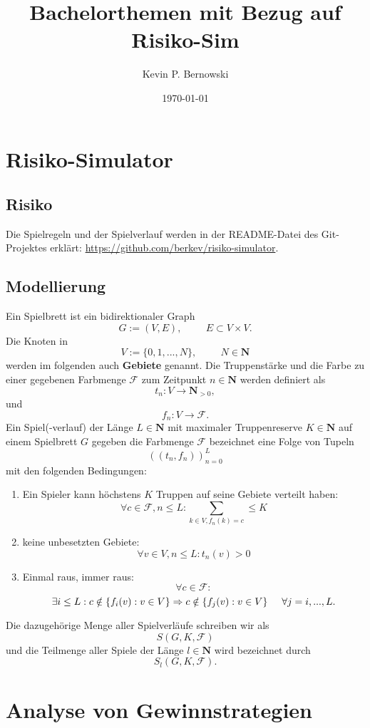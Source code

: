 \documentclass[12pt, letterpaper]{article}
\title{Bachelorthemen mit Bezug auf Risiko-Sim}
\author{Kevin P. Bernowski}
\date{\today}
\begin{document}
\maketitle
\tableofcontents
\section{Risiko-Simulator}
    \subsection{Risiko}

    Die Spielregeln und der Spielverlauf werden in der README-Datei des Git-Projektes erklärt: \url{https://github.com/berkev/risiko-simulator}.

    
    \subsection{Modellierung}

    Ein Spielbrett ist ein bidirektionaler Graph 
    \[G := (V,E), \hspace{1cm} E\subset V\times V.\]
    Die Knoten in 
    \[V :=\{0,1,...,N\}, \hspace{1cm} N \in \mathbf{N} \]
    werden im folgenden auch \textbf{Gebiete} genannt.
    \newline
    Die Truppenstärke und die Farbe zu einer gegebenen Farbmenge $\mathcal{F}$ zum Zeitpunkt $n\in\mathbf{N}$ werden definiert als
    \[ t_{n}:V\rightarrow \mathbf{N}_{>0},
    \] und 
    \[ f_{n}:V\rightarrow \mathcal{F}.\]
    \newline
    Ein Spiel(-verlauf) der Länge $L\in\mathbf{N}$ mit maximaler Truppenreserve $K\in\mathbf{N}$ auf einem Spielbrett $G$ gegeben die Farbmenge $\mathcal{F}$  bezeichnet eine Folge von Tupeln 
    \[((t_{n},f_{n}))_{n=0}^{L}\]
    mit den folgenden Bedingungen:
    \begin{enumerate}
        \item Ein Spieler kann höchstens $K$ Truppen auf seine Gebiete verteilt haben:
        \[\forall c\in\mathcal{F},n\leq L: \sum_{k\in V, f_{n}(k)=c} \leq K\]
        \item keine unbesetzten Gebiete:
        \[\forall v \in V,n\leq L: t_{n}(v)>0\]
        \item Einmal raus, immer raus:
        \[\forall c\in \mathcal{F}:\]
        \[\exists i\leq L: c \notin \{f_{i}(v) : v\in V\} \Rightarrow c \notin \{f_{j}(v) : v\in V\}\hspace{5mm} \forall j=i,...,L.\]
    \end{enumerate}
    Die dazugehörige Menge aller Spielverläufe schreiben wir als
    \[ S(G,K,\mathcal{F}) \]
    und die Teilmenge aller Spiele der Länge $l\in\mathbf{N}$ wird bezeichnet durch
    \[S_{l}(G,K,\mathcal{F}).\]
        

    

    

\section{Analyse von Gewinnstrategien}
\end{document}
